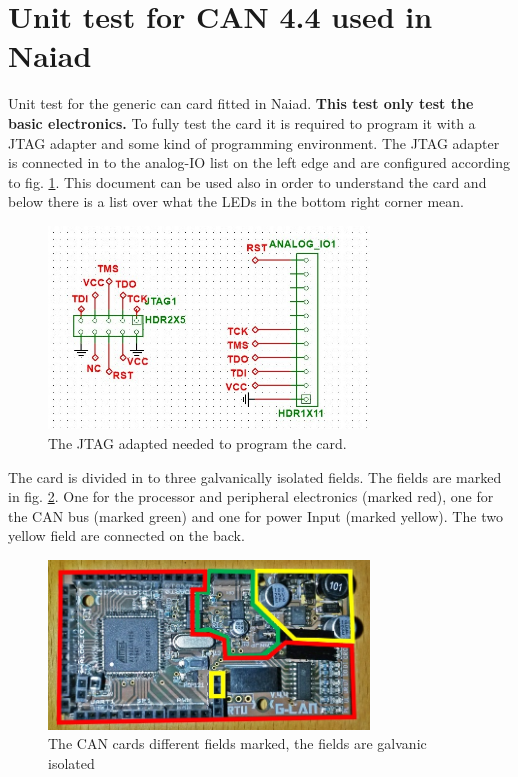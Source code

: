 \section{Unit test for CAN 4.4 used in Naiad}
\label{CAN_unit}
Unit test for the generic can card fitted in Naiad. \textbf{This test only test the basic electronics.} To fully test the card it is required to program it with a JTAG adapter and some kind of programming environment. The JTAG adapter is connected in to the analog-IO list on the left edge and are configured according to fig. \ref{JTAG}. This document can be used also in order to understand the card and below there is a list over what the LEDs in the bottom right corner mean.

\begin{figure}[!ht]
	\begin{center}
		\includegraphics[width=0.76\textwidth]{./Images/Unit-Test-CAN/JTAG.jpg}
		\caption{The JTAG adapted needed to program the card.}
		\label{JTAG}
	\end{center}
\end{figure}

The card is divided in to three galvanically isolated fields. The fields are marked in fig. \ref{CAN_sections}. One for the processor and peripheral electronics (marked red), one for the CAN bus (marked green) and one for power Input (marked yellow). The two yellow field are connected on the back. 

\begin{figure}[!ht]
	\begin{center}
		\includegraphics[width=0.76\textwidth]{./Images/Unit-Test-CAN/CAN_sections.jpg}
		\caption{The CAN cards different fields marked, the fields are galvanic isolated}
		\label{CAN_sections}
	\end{center}
\end{figure}

